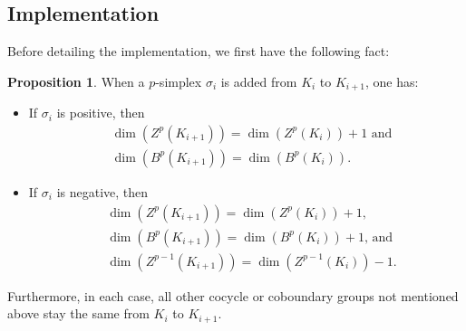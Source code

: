 \documentclass[10pt,a4paper]{amsart}
\theoremstyle{definition}
\newcommand{\fsimp}{\sigma}
\newcommand{\Zyc}{Z}
\newcommand{\Bnd}{B}
\newtheorem{proposition}[theorem]{Proposition}
\theoremstyle{remark}
\begin{document}
\subsection{Implementation}\label{sec:impl}
Before detailing the implementation,
we first have the following fact:

\begin{proposition}\label{prop:dim-chng}
When  a $p$-simplex $\fsimp_i$ is added  from $K_i$ to $K_{i+1}$,
one has:
   \begin{itemize}
   \item If $\fsimp_i$ is positive, then 
   \begin{align*}
       &\dim(\Zyc^p(K_{i+1}))=\dim(\Zyc^p(K_{i}))+1\text{ and}\\
   &\dim(\Bnd^p(K_{i+1}))=\dim(\Bnd^p(K_{i})).
   \end{align*}

   \item If $\fsimp_i$ is negative, then
   \begin{align*}
   &\dim(\Zyc^p(K_{i+1}))=\dim(\Zyc^p(K_{i}))+1\text{, }\\
   &\dim(\Bnd^{p}(K_{i+1}))=\dim(\Bnd^{p}(K_{i}))+1\text{, and}\\
   &\dim(\Zyc^{p-1}(K_{i+1}))=\dim(\Zyc^{p-1}(K_{i}))-1.
   \end{align*}
   \end{itemize}
Furthermore, in each case, all other cocycle or coboundary  groups not mentioned above stay the same
from $K_i$ to $K_{i+1}$.
\end{proposition}
\end{document}
